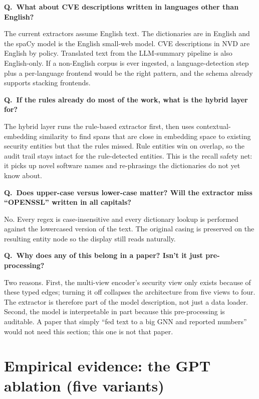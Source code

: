\documentclass[11pt,a4paper]{article}
\newenvironment{question}[1]{%
    \par\smallskip
    \noindent\textcolor{accent}{\bfseries Q.\ #1}\par\nopagebreak
    \smallskip\noindent\ignorespaces
}{\par\medskip}
\begin{document}
\begin{question}{What about CVE descriptions written in
    languages other than English?}
The current extractors assume English text. The dictionaries
are in English and the spaCy model is the English
small-web model. CVE descriptions in NVD are English by
policy. Translated text from the LLM-summary pipeline is
also English-only. If a non-English corpus is ever
ingested, a language-detection step plus a per-language
frontend would be the right pattern, and the schema already
supports stacking frontends.
\end{question}

\begin{question}{If the rules already do most of the work,
    what is the hybrid layer for?}
The hybrid layer runs the rule-based extractor first, then
uses contextual-embedding similarity to find spans that are
close in embedding space to existing security entities but
that the rules missed. Rule entities win on overlap, so
the audit trail stays intact for the rule-detected
entities. This is the recall safety net: it picks up novel
software names and re-phrasings the dictionaries do not yet
know about.
\end{question}

\begin{question}{Does upper-case versus lower-case matter?
    Will the extractor miss ``OPENSSL'' written in all
    capitals?}
No. Every regex is case-insensitive and every dictionary
lookup is performed against the lowercased version of the
text. The original casing is preserved on the resulting
entity node so the display still reads naturally.
\end{question}

\begin{question}{Why does any of this belong in a paper?
    Isn't it just pre-processing?}
Two reasons. First, the multi-view encoder's security view
only exists because of these typed edges; turning it off
collapses the architecture from five views to four. The
extractor is therefore part of the model description, not
just a data loader. Second, the model is interpretable in
part because this pre-processing is auditable. A paper
that simply ``fed text to a big GNN and reported numbers''
would not need this section; this one is not that paper.
\end{question}

\section{Empirical evidence: the GPT ablation (five variants)}
\label{sec:gpt-ablation}
\end{document}
